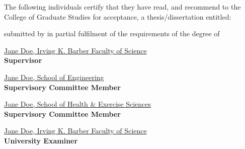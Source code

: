 \frontmatter                    %

\maketitle                      %

\makeatletter
The following individuals certify that they have read, and recommend to the College of Graduate Studies for acceptance, a thesis/dissertation entitled:

\vspace{2ex}

\textsc{\ul\@title}


\vspace{1ex}

\noindent submitted by \underline{\sc \@author} in partial fulfilment of the requirements of the degree of \underline{\@degreetitle}
\makeatother

\newlength{\linespace}
\setlength{\linespace}{.75cm} %
\vspace{2\linespace}\smaller

\noindent\underline{Jane Doe, Irving K. Barber Faculty of Science} 
\\
\textbf{Supervisor}

\vspace{\linespace}

\noindent\underline{Jane Doe, School of Engineering} 
\\
\textbf{Supervisory Committee Member}

\vspace{\linespace}

\noindent\underline{Jane Doe, School of Health \& Exercise Sciences} 
\\
\textbf{Supervisory Committee Member}

\vspace{\linespace}

\noindent\underline{Jane Doe, Irving K. Barber Faculty of Science} 
\\
\textbf{University Examiner}

